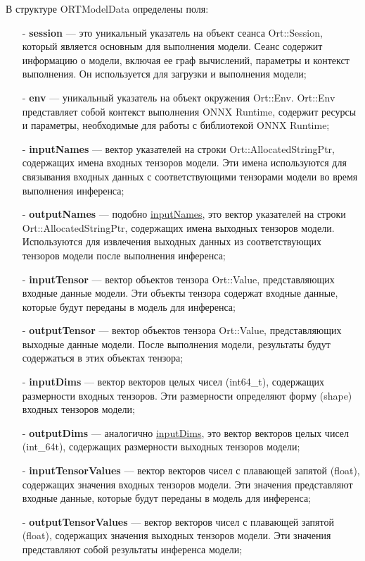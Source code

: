 \documentclass[a4paper,14pt]{extreport}
\begin{document}
        В структуре ORTModelData определены поля:
        \begin{itemize}
          \item[-] \textbf{session} — это уникальный указатель на объект сеанса Ort::Session, который является основным для выполнения модели. Сеанс содержит информацию о модели, включая ее граф вычислений, параметры и контекст выполнения. Он используется для загрузки и выполнения модели;
          \item[-] \textbf{env} — уникальный указатель на объект окружения Ort::Env. Ort::Env представляет собой контекст выполнения ONNX Runtime, содержит ресурсы и параметры, необходимые для работы с библиотекой ONNX Runtime;
          \item[-] \hypertarget{inputNames}{}\textbf{inputNames} — вектор указателей на строки Ort::AllocatedStringPtr, содержащих имена входных тензоров модели. Эти имена используются для связывания входных данных с соответствующими тензорами модели во время выполнения инференса;
          \item[-] \textbf{outputNames} — подобно \hyperlink{inputNames}{inputNames}, это вектор указателей на строки Ort::AllocatedStringPtr, содержащих имена выходных тензоров модели. Используются для извлечения выходных данных из соответствующих тензоров модели после выполнения инференса;
          \item[-] \textbf{inputTensor} — вектор объектов тензора Ort::Value, представляющих входные данные модели. Эти объекты тензора содержат входные данные, которые будут переданы в модель для инференса;
          \item[-] \textbf{outputTensor} — вектор объектов тензора Ort::Value, представляющих выходные данные модели. После выполнения модели, результаты будут содержаться в этих объектах тензора;
          \item[-] \hypertarget{inputDims}{}\textbf{inputDims} — вектор векторов целых чисел (int64\_t), содержащих размерности входных тензоров. Эти размерности определяют форму (shape) входных тензоров модели;
          \item[-] \textbf{outputDims} — аналогично \hyperlink{inputDims}{inputDims}, это вектор векторов целых чисел (int\_64t), содержащих размерности выходных тензоров модели;
          \item[-] \textbf{inputTensorValues} — вектор векторов чисел с плавающей запятой (float), содержащих значения входных тензоров модели. Эти значения представляют входные данные, которые будут переданы в модель для инференса;
          \item[-] \textbf{outputTensorValues} — вектор векторов чисел с плавающей запятой (float), содержащих значения выходных тензоров модели. Эти значения представляют собой результаты инференса модели;
        \end{itemize}
\end{document}
